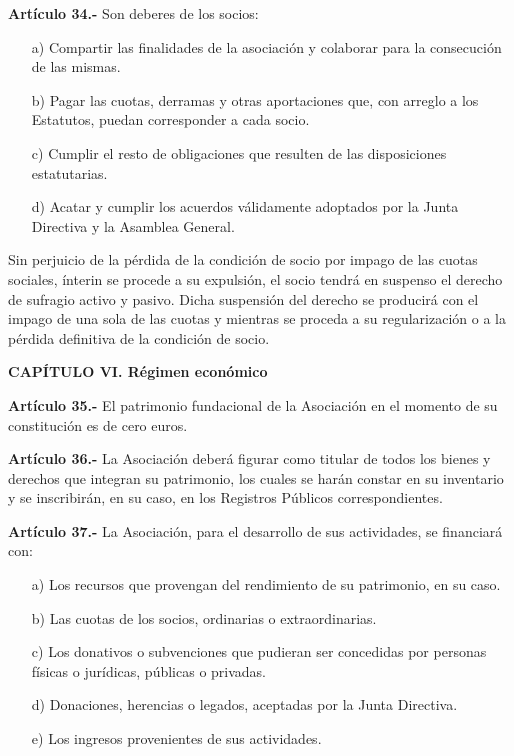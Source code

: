 \documentclass[a4paper,12pt]{article}
\begin{document}
\begin{onehalfspace}
\bigskip\bigskip

\textbf{Art\'iculo 34.-} Son deberes de los socios:
\begin{itemize}
\item [a)] Compartir las finalidades de la asociaci\'on y colaborar para la consecuci\'on de las mismas.
\item [b)] Pagar las cuotas, derramas y otras aportaciones que, con arreglo a los Estatutos, puedan corresponder a cada socio.
\item [c)] Cumplir el resto de obligaciones que resulten de las disposiciones estatutarias.
\item [d)] Acatar y cumplir los acuerdos v\'alidamente adoptados por la Junta Directiva y la Asamblea General.
\end{itemize}

Sin perjuicio de la p\'erdida de la condici\'on de socio por impago de las cuotas sociales, \'interin se procede a su expulsi\'on, el socio tendr\'a en suspenso el derecho de sufragio activo y pasivo. Dicha suspensi\'on del derecho se producir\'a con el impago de una sola de las cuotas y mientras se proceda a su regularizaci\'on o a la p\'erdida definitiva de la condici\'on de socio.

\bigskip\bigskip
\newpage
\begin{center}
\textbf{CAP\'ITULO VI. R\'egimen econ\'omico}
\end{center}

\bigskip\bigskip

\textbf{Art\'iculo 35.-} El patrimonio fundacional de la Asociaci\'on en el momento de su constituci\'on es de cero euros.

\bigskip\bigskip

\textbf{Art\'iculo 36.-} La Asociaci\'on deber\'a figurar como titular de todos los bienes y derechos que integran su patrimonio, los cuales se har\'an constar en su inventario y se inscribir\'an, en su caso, en los Registros P\'ublicos correspondientes.

\bigskip\bigskip

\textbf{Art\'iculo 37.-} La Asociaci\'on, para el desarrollo de sus actividades, se financiar\'a con:
\begin{itemize}
\item [a)] Los recursos que provengan del rendimiento de su patrimonio, en su caso.
\item [b)] Las cuotas de los socios, ordinarias o extraordinarias.
\item [c)] Los donativos o subvenciones que pudieran ser concedidas por personas f\'isicas o jur\'idicas, p\'ublicas o privadas.
\item [d)] Donaciones, herencias o legados, aceptadas por la Junta Directiva.
\item [e)] Los ingresos provenientes de sus actividades.
\end{itemize}


\end{onehalfspace}
\end{document}
